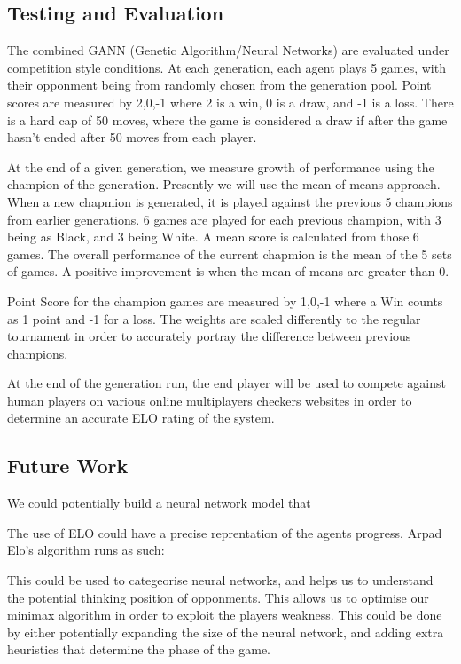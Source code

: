 \documentclass[12pt,a4paper]{article}
\begin{document}
\subsection*{Testing and Evaluation}
    The combined GANN (Genetic Algorithm/Neural Networks) are evaluated under competition style conditions. At each generation, each agent plays 5 games, with their opponment being from randomly chosen from the generation pool. Point scores are measured by {2,0,-1} where 2 is a win, 0 is a draw, and -1 is a loss. There is a hard cap of 50 moves, where the game is considered a draw if after the game hasn't ended after 50 moves from each player.

    At the end of a given generation, we measure growth of performance using the champion of the generation. Presently we will use the mean of means approach. When a new chapmion is generated, it is played against the previous 5 champions from earlier generations. 6 games are played for each previous champion, with 3 being as Black, and 3 being White. A mean score is calculated from those 6 games. The overall performance of the current chapmion is the mean of the 5 sets of games. A positive improvement is when the mean of means are greater than 0. 

    Point Score for the champion games are measured by {1,0,-1} where a Win counts as 1 point and -1 for a loss. The weights are scaled differently to the regular tournament in order to accurately portray the difference between previous champions.

    At the end of the generation run, the end player will be used to compete against human players on various online multiplayers checkers websites in order to determine an accurate ELO rating of the system.

\subsection{Future Work}
    We could potentially build a neural network model that 

    The use of ELO could have a precise reprentation of the agents progress. Arpad Elo's algorithm runs as such:

    This could be used to categeorise neural networks, and helps us to understand the potential thinking position of opponments. This allows us to optimise our minimax algorithm in order to exploit the players weakness. This could be done by either potentially expanding the size of the neural network, and adding extra heuristics that determine the phase of the game.
\end{document}
